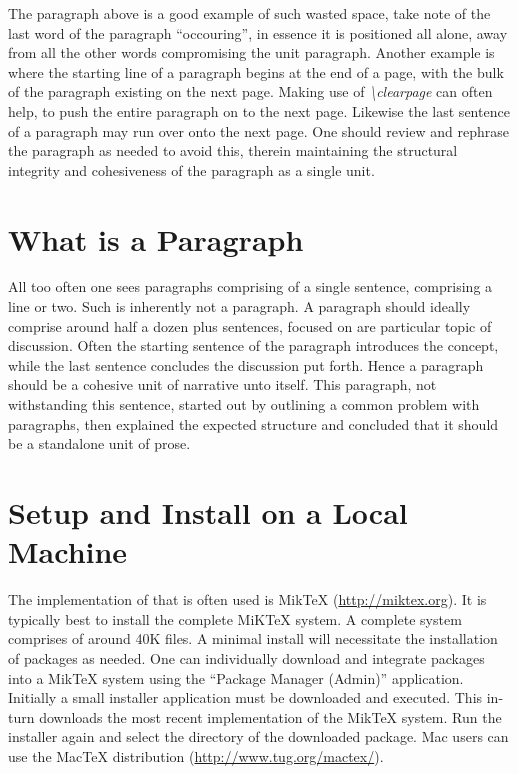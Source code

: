 The paragraph above is a good example of such wasted space, take note of the last word of the paragraph ``occouring'', in essence it is positioned all alone, away from all the other words compromising the unit paragraph. Another example is where the starting line of a paragraph begins at the end of a page, with the bulk of the paragraph existing on the next page. Making use of \emph{\textbackslash clearpage} can often help, to push the entire paragraph on to the next page. Likewise the last sentence of a paragraph may run over onto the next page. One should review and rephrase the paragraph as needed to avoid this, therein maintaining the structural integrity and cohesiveness of the paragraph as a single unit. 

\section{What is a Paragraph}
All too often one sees paragraphs comprising of a single sentence, comprising a line or two. Such is inherently not a paragraph. A paragraph should ideally comprise around half a dozen plus sentences, focused on are particular topic of discussion. Often the starting sentence of the paragraph introduces the concept, while the last sentence concludes the discussion put forth. Hence a paragraph should be a cohesive unit of narrative unto itself. This paragraph, not withstanding this sentence, started out by outlining a common problem with paragraphs, then explained the expected structure and concluded that it should be a standalone unit of prose. 

\section{\latex Setup and Install on a Local Machine}
The implementation of \latex that is often used is MikTeX (\url{http://miktex.org}). It is typically best to install the complete MiKTeX  system. A complete system comprises of around 40K files. A minimal install will necessitate the installation of packages as needed. One can individually download and integrate packages into a MikTeX system using the ``Package Manager (Admin)'' application. Initially a small installer application must be downloaded and executed. This in-turn downloads the most recent implementation of the MikTeX system. Run the installer again and select the directory of the downloaded package. Mac users can use the MacTeX distribution (\url{http://www.tug.org/mactex/}). 

